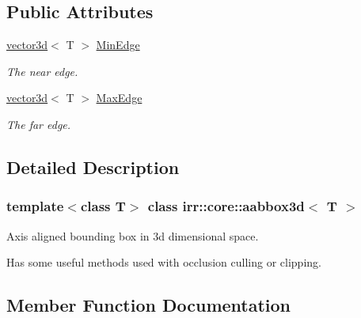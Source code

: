 \subsection*{Public Attributes}
\begin{DoxyCompactItemize}
\item 
\mbox{\label{classirr_1_1core_1_1aabbox3d_a7501c7df834939fa25e5f70b8527e7b5}} 
\hyperlink{classirr_1_1core_1_1vector3d}{vector3d}$<$ T $>$ \hyperlink{classirr_1_1core_1_1aabbox3d_a7501c7df834939fa25e5f70b8527e7b5}{Min\+Edge}
\begin{DoxyCompactList}\small\item\em The near edge. \end{DoxyCompactList}\item 
\mbox{\label{classirr_1_1core_1_1aabbox3d_a5aad7217e8189f09dde3ec4a69e4ac92}} 
\hyperlink{classirr_1_1core_1_1vector3d}{vector3d}$<$ T $>$ \hyperlink{classirr_1_1core_1_1aabbox3d_a5aad7217e8189f09dde3ec4a69e4ac92}{Max\+Edge}
\begin{DoxyCompactList}\small\item\em The far edge. \end{DoxyCompactList}\end{DoxyCompactItemize}


\subsection{Detailed Description}
\subsubsection*{template$<$class T$>$\newline
class irr\+::core\+::aabbox3d$<$ T $>$}

Axis aligned bounding box in 3d dimensional space. 

Has some useful methods used with occlusion culling or clipping. 

\subsection{Member Function Documentation}
\mbox{\label{classirr_1_1core_1_1aabbox3d_a7ccc210a3fb0ce82765d28f2047942c5}} 
